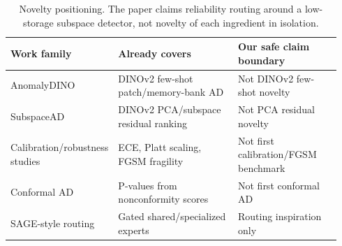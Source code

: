 \begin{table}[t]
\centering
\caption{Novelty positioning. The paper claims reliability routing around a low-storage subspace detector, not novelty of each ingredient in isolation.}
\label{tab:prior-positioning}
\footnotesize
\setlength{\tabcolsep}{3pt}
\begin{tabular}{p{0.24\linewidth}p{0.38\linewidth}p{0.32\linewidth}}
\toprule
Work family & Already covers & Our safe claim boundary \\
\midrule
AnomalyDINO & DINOv2 few-shot patch/memory-bank AD & Not DINOv2 few-shot novelty \\
SubspaceAD & DINOv2 PCA/subspace residual ranking & Not PCA residual novelty \\
Calibration/robustness studies & ECE, Platt scaling, FGSM fragility & Not first calibration/FGSM benchmark \\
Conformal AD & P-values from nonconformity scores & Not first conformal AD \\
SAGE-style routing & Gated shared/specialized experts & Routing inspiration only \\
\bottomrule
\end{tabular}
\end{table}
